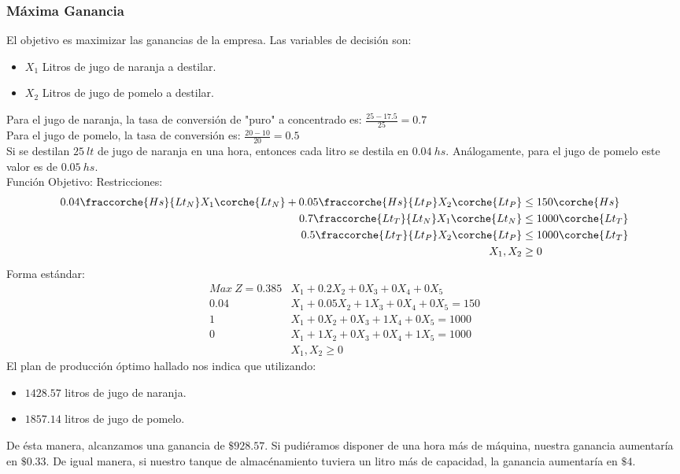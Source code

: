 \begin{homeworkProblem}[-1][Citrus]
\subsubsection{Máxima Ganancia}
El objetivo es maximizar las ganancias de la empresa.
Las variables de decisión son:
\begin{itemize}
  \item $X_1$ Litros de jugo de naranja a destilar.
  \item $X_2$ Litros de jugo de pomelo a destilar.
\end{itemize}
Para el jugo de naranja, la tasa de conversión de "puro" a concentrado es: $\frac{25-17.5}{25} = 0.7$ \\
Para el jugo de pomelo, la tasa de conversión es: $ \frac{20-10}{20} = 0.5$ \\
Si se destilan $25\ lt$ de jugo de naranja en una hora, entonces cada litro se destila en $0.04\ hs$. Análogamente, para el jugo de pomelo este valor es de $0.05\ hs$. \\
Función Objetivo: 
Restricciones:
\begin{align*}
  0.04\fraccorche{Hs}{Lt_N}X_1\corche{Lt_N} + 0.05\fraccorche{Hs}{Lt_P}X_2\corche{Lt_P} &\le 150\corche{Hs} \\
  0.7\fraccorche{Lt_T}{Lt_N}X_1\corche{Lt_N}                                            &\le 1000\corche{Lt_T} \\
  0.5\fraccorche{Lt_T}{Lt_P}X_2\corche{Lt_P}                                            &\le 1000\corche{Lt_T} \\
  X_1,X_2 &\ge 0 
\end{align*}
Forma estándar:
\begin{align*}
    Max\ Z = 0.385&X_1 + 0.2X_2 + 0X_3 + 0X_4 + 0X_5 \\
    0.04&X_1 + 0.05X_2 + 1X_3 + 0X_4 + 0X_5 = 150 \\
    1&X_1 + 0X_2 + 0X_3 + 1X_4 + 0X_5 = 1000 \\
    0&X_1 + 1X_2 + 0X_3 + 0X_4 + 1X_5 = 1000 \\
    &X_1,X_2 \ge 0
\end{align*}
El plan de producción óptimo hallado nos indica que utilizando: 
\begin{itemize}
  \item $1428.57$ litros de jugo de naranja.
  \item $1857.14$ litros de jugo de pomelo.
\end{itemize}
De ésta manera, alcanzamos una ganancia de $\$928.57$. Si pudiéramos disponer de una hora más de máquina, nuestra ganancia aumentaría en $\$0.33$. De igual manera, si nuestro tanque de almacénamiento tuviera un litro más de capacidad, la ganancia aumentaría en $\$4$.


\end{homeworkProblem}
